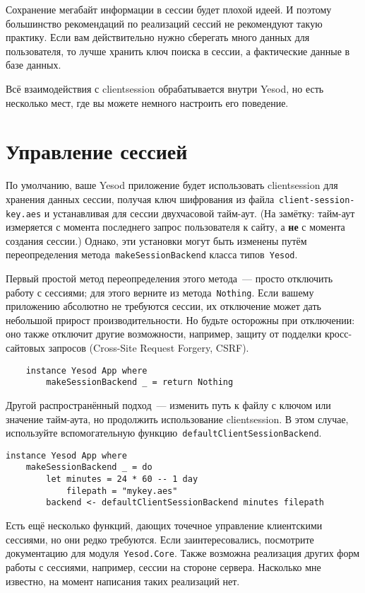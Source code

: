 Сохранение мегабайт информации в сессии будет плохой идеей. И поэтому
большинство рекомендаций по реализаций сессий не рекомендуют такую практику.
Если вам действительно нужно сберегать много данных для пользователя, то лучше
хранить ключ поиска в сессии, а фактические данные в базе данных.

Всё взаимодействия с clientsession обрабатывается внутри Yesod, но есть
несколько мест, где вы можете немного настроить его поведение.

\section{Управление сессией}
По умолчанию, ваше Yesod приложение будет использовать clientsession для
хранения данных сессии, получая ключ шифрования из
файла~\texttt{client-session-key.aes} и устанавливая для сессии двухчасовой
тайм-аут. (На замётку: тайм-аут измеряется с момента последнего запрос
пользователя к сайту, а \textbf{не} с момента создания сессии.) Однако, эти
установки могут быть изменены путём переопределения
метода~\lstinline'makeSessionBackend' класса типов~\lstinline'Yesod'.

Первый простой метод переопределения этого метода~--- просто отключить работу с
сессиями; для этого верните из метода~\lstinline'Nothing'. Если вашему
приложению абсолютно не требуются сессии, их отключение может дать небольшой
прирост производительности. Но будьте осторожны при отключении: оно также
отключит другие возможности, например, защиту от подделки кросс-сайтовых
запросов (Cross-Site Request Forgery, CSRF).

\begin{lstlisting}
    instance Yesod App where
        makeSessionBackend _ = return Nothing
\end{lstlisting}

Другой распространённый подход~--- изменить путь к файлу с ключом или значение
тайм-аута, но продолжить использование clientsession. В этом случае,
используйте вспомогательную функцию~\lstinline'defaultClientSessionBackend'.

\begin{lstlisting}
instance Yesod App where
    makeSessionBackend _ = do
        let minutes = 24 * 60 -- 1 day
            filepath = "mykey.aes"
        backend <- defaultClientSessionBackend minutes filepath
\end{lstlisting}

Есть ещё несколько функций, дающих точечное управление клиентскими сессиями, но
они редко требуются. Если заинтересовались, посмотрите документацию для
модуля~\lstinline'Yesod.Core'. Также возможна реализация других форм работы с
сессиями, например, сессии на стороне сервера. Насколько мне известно, на
момент написания таких реализаций нет.

